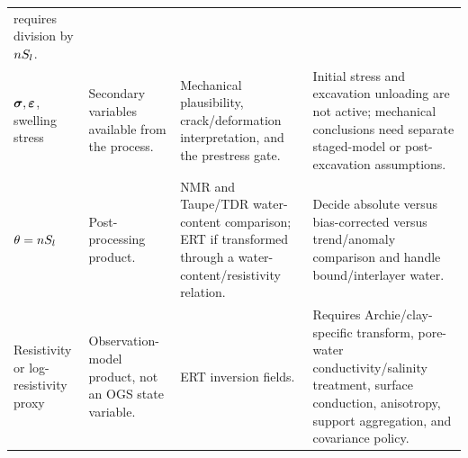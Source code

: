 \begin{longtable}{@{}L{0.17\textwidth} L{0.21\textwidth} L{0.25\textwidth} L{0.27\textwidth}@{}}
requires division by \(nS_l\).\\
\(\bm{\sigma},\bm{\varepsilon}\), swelling stress &
Secondary variables available from the process. &
Mechanical plausibility, crack/deformation interpretation, and the prestress gate. &
Initial stress and excavation unloading are not active; mechanical conclusions need
separate staged-model or post-excavation assumptions.\\
\(\theta=nS_l\) &
Post-processing product. &
NMR and Taupe/TDR water-content comparison; ERT if transformed through a
water-content/resistivity relation. &
Decide absolute versus bias-corrected versus trend/anomaly comparison and handle
bound/interlayer water.\\
Resistivity or log-resistivity proxy &
Observation-model product, not an OGS state variable. &
ERT inversion fields. &
Requires Archie/clay-specific transform, pore-water conductivity/salinity treatment,
surface conduction, anisotropy, support aggregation, and covariance policy.\\
\end{longtable}
\endgroup
